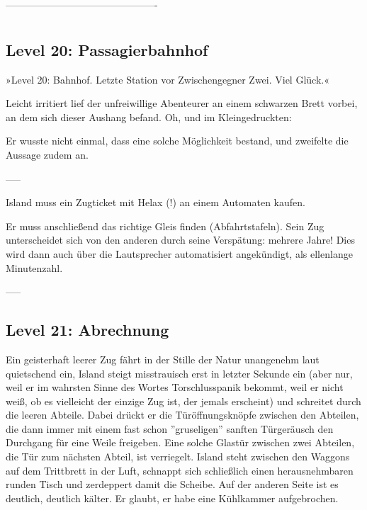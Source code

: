 ----------------------------------------------

























\chapter{}


\section{Level 20: Passagierbahnhof}

»Level 20: Bahnhof. Letzte Station vor Zwischengegner Zwei. Viel Glück.«

Leicht irritiert lief der unfreiwillige Abenteurer an einem schwarzen Brett vorbei, an dem sich dieser Aushang befand. Oh, und im Kleingedruckten:


Er wusste nicht einmal, dass eine solche Möglichkeit bestand, und zweifelte die Aussage zudem an.

-----

Island muss ein Zugticket mit Helax (!) an einem Automaten kaufen.

Er muss anschließend das richtige Gleis finden (Abfahrtstafeln). Sein Zug unterscheidet sich von den anderen durch seine Verspätung: mehrere Jahre! Dies wird dann auch über die Lautsprecher automatisiert angekündigt, als ellenlange Minutenzahl.

-----

\section{Level 21: Abrechnung}

Ein geisterhaft leerer Zug fährt in der Stille der Natur unangenehm laut quietschend ein, Island steigt misstrauisch erst in letzter Sekunde ein (aber nur, weil er im wahrsten Sinne des Wortes Torschlusspanik bekommt, weil er nicht weiß, ob es vielleicht der einzige Zug ist, der jemals erscheint) und schreitet durch die leeren Abteile. Dabei drückt er die Türöffnungsknöpfe zwischen den Abteilen, die dann immer mit einem fast schon ''gruseligen'' sanften Türgeräusch den Durchgang für eine Weile freigeben. Eine solche Glastür zwischen zwei Abteilen, die Tür zum nächsten Abteil, ist verriegelt. Island steht zwischen den Waggons auf dem Trittbrett in der Luft, schnappt sich schließlich einen herausnehmbaren runden Tisch und zerdeppert damit die Scheibe. Auf der anderen Seite ist es deutlich, deutlich kälter. Er glaubt, er habe eine Kühlkammer aufgebrochen.

